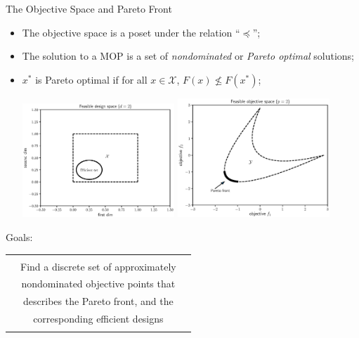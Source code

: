 \documentclass[xcolor=dvipsnames]{beamer}
\begin{document}
\begin{frame}{The Objective Space and Pareto Front}
\begin{itemize}
\item The objective space is a poset under the relation ``$\preceq$'';
\item The solution to a MOP is a set of {\it nondominated} or
{\it Pareto optimal} solutions;
\item $x^*$ is Pareto optimal if for all $x\in\mathcal{X}$, $F(x) \not\leq F(x^*)$;
\begin{center}
\includegraphics[width=0.45\textwidth]{feasible_design.eps}
\includegraphics[width=0.45\textwidth]{convex_pareto.eps}
\end{center}
\end{itemize}
\end{frame}
\begin{frame}{Goals:}
\begin{center}
\begin{tabular}{|ccc|}
\hline
&&\\
&{\large Find a discrete set of approximately}&\\
&{\large nondominated objective points that}&\\
&{\large describes the Pareto front, and the}&\\
&{\large corresponding efficient designs}&\\
&&\\
\hline
\end{tabular}
\end{center}
\end{frame}
\end{document}

